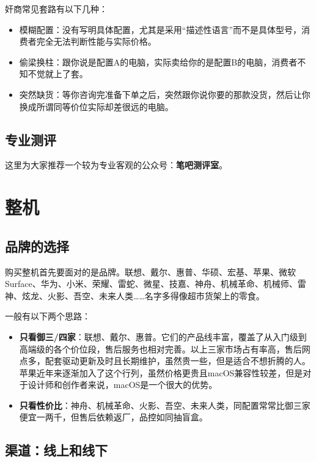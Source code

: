 \documentclass[../main.tex]{subfiles}
\begin{document}
奸商常见套路有以下几种：
\begin{itemize}
  \item 模糊配置：没有写明具体配置，尤其是采用“描述性语言”而不是具体型号，消费者完全无法判断性能与实际价格。
  \item 偷梁换柱：跟你说是配置A的电脑，实际卖给你的是配置B的电脑，消费者不知不觉就上了套。
  \item 突然缺货：等你咨询完准备下单之后，突然跟你说你要的那款没货，然后让你换成所谓同等价位实际却差很远的电脑。
\end{itemize}

\subsection{专业测评}

这里为大家推荐一个较为专业客观的公众号：\textbf{笔吧测评室}。

\section{整机}

\subsection{品牌的选择}

购买整机首先要面对的是品牌。联想、戴尔、惠普、华硕、宏基、苹果、微软 Surface、华为、小米、荣耀、雷蛇、微星、技嘉、神舟、机械革命、机械师、雷神、炫龙、火影、吾空、未来人类……名字多得像超市货架上的零食。

一般有以下两个思路：

\begin{itemize}
  \item \textbf{只看御三/四家}：联想、戴尔、惠普。它们的产品线丰富，覆盖了从入门级到高端级的各个价位段，售后服务也相对完善。以上三家市场占有率高，售后网点多，配套驱动更新及时且长期维护，虽然贵一些，但是适合不想折腾的人。苹果近年来逐渐加入了这个行列，虽然价格更贵且macOS兼容性较差，但是对于设计师和创作者来说，macOS是一个很大的优势。
  \item \textbf{只看性价比}：神舟、机械革命、火影、吾空、未来人类，同配置常常比御三家便宜一两千，但售后依赖返厂，品控如同抽盲盒。
\end{itemize}

\subsection{渠道：线上和线下}
\end{document}
